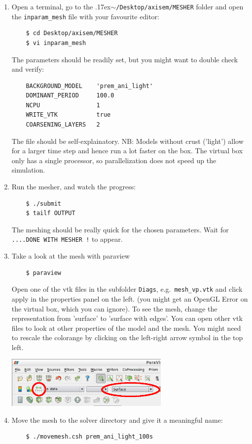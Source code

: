 \documentclass{article}
\newcommand{\ttilde}[0]{\raise.17ex\hbox{$\scriptstyle\sim$}}
\begin{document}
\begin{enumerate}
    \item Open a terminal, go to the \ttilde\verb|/Desktop/axisem/MESHER| folder and open
    the \verb|inparam_mesh| file with your favourite editor:
    \begin{verbatim}
    $ cd Desktop/axisem/MESHER
    $ vi inparam_mesh
    \end{verbatim}
    The parameters should be readily set, but you might want to double check and verify:
    \begin{verbatim}
    BACKGROUND_MODEL    'prem_ani_light'
    DOMINANT_PERIOD     100.0
    NCPU                1
    WRITE_VTK           true
    COARSENING_LAYERS   2
    \end{verbatim}
    The file should be self-explainatory. NB: Models without crust ('light') allow for a
    larger time step and hence run a lot faster on the box. The virtual box only has a
    single processor, so parallelization does not speed up the simulation.

    \item Run the mesher, and watch the progress:
    \begin{verbatim}
    $ ./submit
    $ tailf OUTPUT
    \end{verbatim}
    The meshing should be really quick for the chosen parameters. Wait for 
    \verb|....DONE WITH MESHER !| to appear.

    \item Take a look at the mesh with paraview
    \begin{verbatim}
    $ paraview
    \end{verbatim}
    Open one of the vtk files in the subfolder \verb|Diags|, e.g.\ \verb|mesh_vp.vtk|
    and click apply in the properties panel on the left. (you might get an OpenGL Error
    on the virtual box, which you can ignore). To see the mesh, change the representation
    from 'surface' to 'surface with edges'. You can open other vtk files to look at other
    properties of the model and the mesh. You might need to rescale the colorange by
    clicking on the left-right arrow symbol in the top left.

    \begin{center}
    \includegraphics[width=80mm]{paraview.png}
    \end{center}
        
    \item Move the mesh to the solver directory and give it a meaningful name:
    \begin{verbatim}
    $ ./movemesh.csh prem_ani_light_100s
    \end{verbatim}

\end{enumerate}
\end{document}
